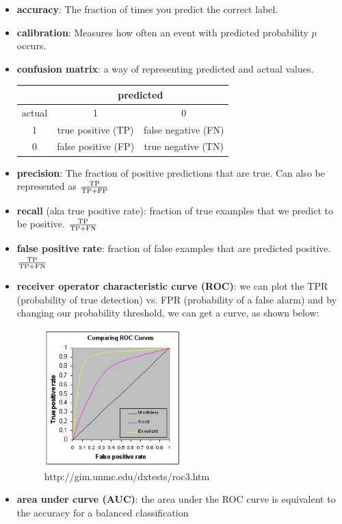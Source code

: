 \begin{itemize}
\item \textbf{accuracy}: The fraction of times you predict the correct label.
\item \textbf{calibration}: Measures how often an event with predicted probability $p$ occurs. 

\item \textbf{confusion matrix}: a way of representing predicted and actual values.
\begin{center}
\begin{tabular}{ |c|c|c| } 
 \hline
  & \multicolumn{2}{|c|}{predicted} \\
  \hline
  actual & 1 & 0 \\
  \hline
  1 & true positive (TP) & false negative (FN) \\
  \hline 
  0 & false positive (FP) & true negative (TN) \\
 \hline
\end{tabular}
\end{center}

\item \textbf{precision}: The fraction of positive predictions that are true. Can also be represented as $\frac{\textnormal{TP}}{\textnormal{TP}+\textnormal{FP}}$
\item \textbf{recall} (aka true positive rate): fraction of true examples that we predict to be positive. $\frac{\textnormal{TP}}{\textnormal{TP}+\textnormal{FN}}$
\item \textbf{false positive rate}: fraction of false examples that are predicted positive. $\frac{\textnormal{TP}}{\textnormal{TP}+\textnormal{FN}}$

\item \textbf{receiver operator characteristic curve (ROC)}: we can plot the TPR (probability of true detection) vs. FPR (probability of a false alarm) and by changing our probability threshold, we can get a curve, as shown below:
\begin{figure}[ht]
  \begin{center}
    \includegraphics[width=0.5\textwidth]{figures/roc-curve.jpg}
    \caption{
      http://gim.unmc.edu/dxtests/roc3.htm}
    \label{fig:roc}
  \end{center}
\end{figure}

\item \textbf{area under curve (AUC)}: the area under the ROC curve is equivalent to the accuracy for a balanced classification

\end{itemize}

